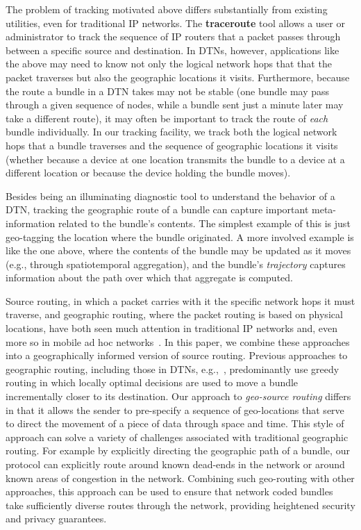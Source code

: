 The problem of tracking motivated above differs substantially from existing utilities, even for traditional IP networks. The {\bf traceroute} tool allows a user or administrator to track the sequence of IP routers that a packet passes through between a specific source and destination. In DTNs, however, applications like the above may need to know not only the logical network hops that that the packet traverses but also the geographic locations it visits. Furthermore, because the route a bundle in a DTN takes may not be stable (one bundle may pass through a given sequence of nodes, while a bundle sent just a minute later may take a different route), it may often be important to track the route of {\em each} bundle individually. In our tracking facility, we track both the logical network hops that a bundle traverses and the sequence of geographic locations it visits (whether because a device at one location transmits the bundle to a device at a different location or because the device holding the bundle moves).

Besides being an illuminating diagnostic tool to understand the behavior of a DTN, tracking the geographic route of a bundle can capture important meta-information related to the bundle's contents. The simplest example of this is just geo-tagging the location where the bundle originated. A more involved example is like the one above, where the contents of the bundle may be updated as it moves (e.g., through spatiotemporal aggregation), and the bundle's {\em trajectory} captures information about the path over which that aggregate is computed.

Source routing, in which a packet carries with it the specific network hops it must traverse, and geographic routing, where the packet routing is based on physical locations, have both seen much attention in traditional IP networks and, even more so in mobile ad hoc networks~\cite{johnson96:dynamic, karp00:gpsr}. In this paper, we combine these approaches into a geographically informed version of source routing. Previous approaches to geographic routing, including those in DTNs, e.g.,~\cite{soares14:geospray}, predominantly use greedy routing in which locally optimal decisions are used to move a bundle incrementally closer to its destination. Our approach to {\em geo-source routing} differs in that it allows the sender to pre-specify a sequence of geo-locations that serve to direct the movement of a piece of data through space and time. This style of approach can solve a variety of challenges associated with traditional geographic routing. For example by explicitly directing the geographic path of a bundle, our protocol can explicitly route around known dead-ends in the network or around known areas of congestion in the network. Combining such geo-routing with other approaches, this approach can be used to ensure that network coded bundles~\cite{petz11:network, widmer05:network} take sufficiently diverse routes through the network, providing heightened security and privacy guarantees.

